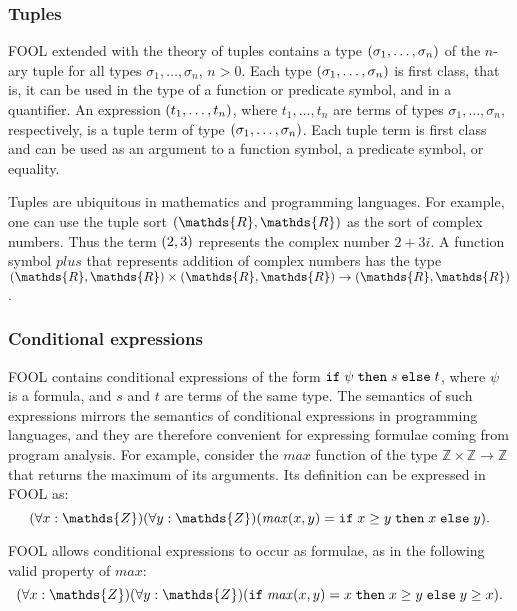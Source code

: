 \documentclass{easychair}
\begin{document}
\subsubsection{Tuples}
FOOL extended with the theory of tuples contains a type
$({\sigma_1,\ldots,\sigma_n})$ of the $n$-ary tuple for all types
$\sigma_1,\ldots,\sigma_n$, $n>0$. Each type
$({\sigma_1,\ldots,\sigma_n})$ is first class, that is, it can be
used in the type of a function or predicate symbol, and in a quantifier. 
An expression $({t_1,\ldots,t_n})$, where $t_1,\ldots,t_n$ are
terms of types $\sigma_1,\ldots,\sigma_n$, respectively, is a tuple term of 
type $({\sigma_1,\ldots,\sigma_n})$. 
Each tuple term is first class and can be used as an argument to a function 
symbol, a predicate symbol, or equality.

Tuples are ubiquitous in mathematics and programming languages. For example,
one can use the tuple sort $\tuple{\mathds{R},\mathds{R}}$ as the sort of
complex numbers. 
Thus the term $({2,3})$ represents the complex number $2+3i$. 
A function symbol $\mathit{plus}$ that represents addition of complex numbers 
has the type $\tuple{\mathds{R},\mathds{R}} \times 
\tuple{\mathds{R},\mathds{R}} \to \tuple{\mathds{R},\mathds{R}}$.

\subsubsection{Conditional expressions}
FOOL contains conditional expressions of the form $\mathtt{if}\;{\psi}\;\allowbreak\mathtt{then}\;{s}\;\allowbreak\mathtt{else}\;{t}$, where 
$\psi$ is a formula, and $s$ and $t$ are terms of the same type. 
The semantics of such expressions mirrors the semantics of conditional 
expressions in programming languages, and they are therefore convenient for 
expressing formulae coming from program analysis. 
For example, consider the $\mathit{max}$ function of the type 
$\mathds{Z}\times\mathds{Z}\to\mathds{Z}$ that returns the maximum of its 
arguments. 
Its definition can be expressed in FOOL as:
\begin{equation}\label{eq:ite-t-example}
(\forall x:\mathds{Z})(\forall y:\mathds{Z})
(\mathit{max}(x, y) = \ite{x \geq y}{x}{y}).
\end{equation}

FOOL allows conditional expressions to occur as formulae, as in the
following valid property of $\mathit{max}$:
\begin{equation}\label{eq:ite-f-example}
(\forall x:\mathds{Z})(\forall y:\mathds{Z})
(\ite{\mathit{max}(x, y) = x}{x \geq y}{y \geq x}).
\end{equation}
\end{document}
